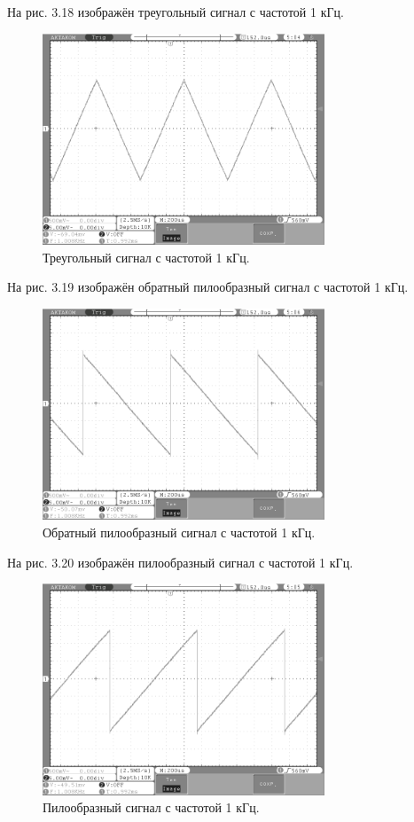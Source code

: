 	На рис. 3.18 изображён треугольный сигнал с частотой 1 кГц.
	\begin{figure}[H]
    \centering
    \includegraphics[width=0.75\textwidth]{../image/triangle1.bmp}
    \caption{Треугольный сигнал с частотой 1 кГц.}
	\end{figure}	

	На рис. 3.19 изображён обратный пилообразный сигнал с частотой 1 кГц.
	
	\begin{figure}[H]
    \centering
    \includegraphics[width=0.75\textwidth]{../image/l_saw1.bmp}
    \caption{Обратный пилообразный сигнал с частотой 1 кГц.}
	\end{figure}	

	На рис. 3.20 изображён пилообразный сигнал с частотой 1 кГц.	
	\begin{figure}[H]
    \centering
    \includegraphics[width=0.75\textwidth]{../image/r_saw1.bmp}
    \caption{Пилообразный сигнал с частотой 1 кГц.}
	\end{figure}	
	
